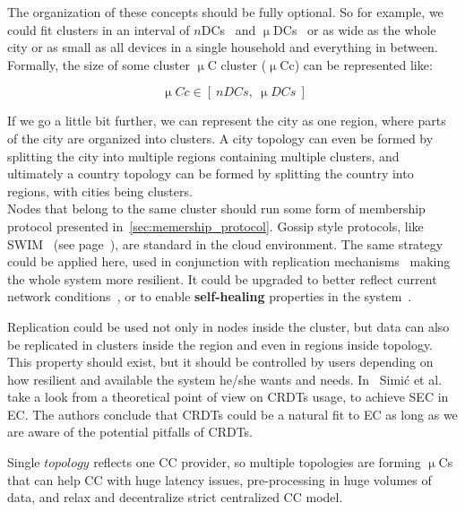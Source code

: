The organization of these concepts should be fully optional. So for example, we could fit clusters in an interval of $n$DCs~\cite{inbookKurniawan} and $\upmu$DCs~\cite{GreenbergHMP09} or as wide as the whole city or as small as all devices in a single household and everything in between. Formally, the size of some cluster $\upmu$C cluster ($\upmu$Cc) can be represented like:

\begin{equation}~\label{size:eq1}
	\upmu Cc \in \left[ \ n DCs, \ \upmu DCs \ \right]
\end{equation}

\noindent
If we go a little bit further, we can represent the city as one region, where parts of the city are organized into clusters. A city topology can even be formed by splitting the city into multiple regions containing multiple clusters, and ultimately a country topology can be formed by splitting the country into regions, with cities being clusters.\\

Nodes that belong to the same cluster should run some form of membership protocol presented in~\ref{sec:memership_protocol}. Gossip style protocols, like SWIM~\cite{DasGM02} (see page~\pageref{swim}), are standard in the cloud environment. The same strategy could be applied here, used in conjunction with replication mechanisms~\cite{LiBCL20, CauCBFCEB16, CRDTS_Nuno} making the whole system more resilient. It could be upgraded to better reflect current network conditions~\cite{HayashibaraDYK04}, or to enable \textbf{self-healing} properties in the system~\cite{SatzgerPTU07}.

Replication could be used not only in nodes inside the cluster, but data can also be replicated in clusters inside the region and even in regions inside topology. This property should exist, but it should be controlled by users depending on how resilient and available the system he/she wants and needs. In~\cite{inproceedingsSimic2} Simi\' c et al. take a look from a theoretical point of view on CRDTs usage, to achieve SEC in EC. The authors conclude that CRDTs could be a natural fit to EC as long as we are aware of the potential pitfalls of CRDTs.

Single $topology$ reflects one CC provider, so multiple topologies are forming $\upmu$Cs that can help CC with huge latency issues, pre-processing in huge volumes of data, and relax and decentralize strict centralized CC model.

